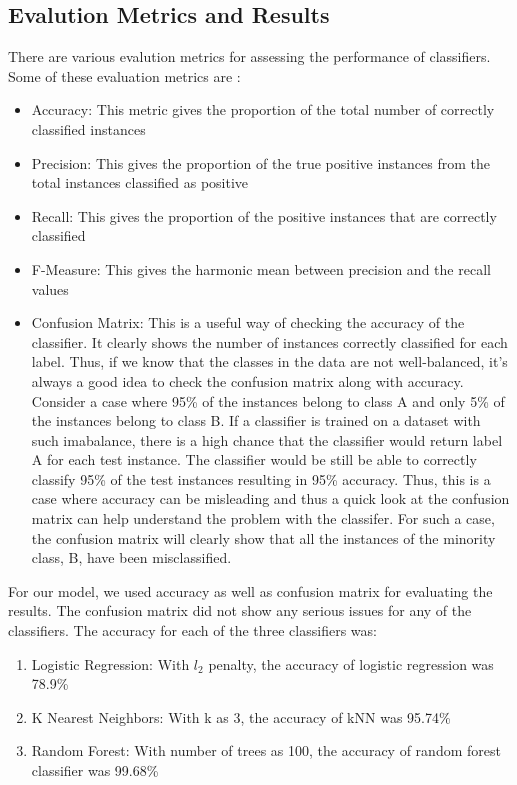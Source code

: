 \documentclass[sigconf]{acmart}
\begin{document}
\subsection{Evalution Metrics and Results}
There are various evalution metrics for assessing the performance of classifiers. Some of these evaluation metrics are \cite{hossin2015review}:
\begin{itemize}
	\item Accuracy: This metric gives the proportion of the total number of correctly classified instances
	\item Precision: This gives the proportion of the true positive instances from the total instances classified as positive
	\item Recall: This gives the proportion of the positive instances that are correctly classified
	\item F-Measure: This gives the harmonic mean between precision and the recall values
	\item Confusion Matrix: This is a useful way of checking the accuracy of the classifier. It clearly shows the number of instances correctly classified for each label. Thus, if we know that the classes in the data are not well-balanced, it's always a good idea to check the confusion matrix along with accuracy. Consider a case where 95\% of the instances belong to class A and only 5\% of the instances belong to class B. If a classifier is trained on a dataset with such imabalance, there is a high chance that the classifier would return label A for each test instance. The classifier would be still be able to correctly classify 95\% of the test instances resulting in 95\% accuracy. Thus, this is a case where accuracy can be misleading and thus a quick look at the confusion matrix can help understand the problem with the classifer. For such a case, the confusion matrix will clearly show that all the instances of the minority class, B, have been misclassified.
\end{itemize}

For our model, we used accuracy as well as confusion matrix for evaluating the results. The confusion matrix did not show any serious issues for any of the classifiers. The accuracy for each of the three classifiers was:

\begin{enumerate}
  \item Logistic Regression: With $l_2$ penalty, the accuracy of logistic regression was 78.9\%
  \item K Nearest Neighbors: With k as 3, the accuracy of kNN was 95.74\%
  \item Random Forest: With number of trees as 100, the accuracy of random forest classifier was 99.68\%
\end{enumerate}
\end{document}

